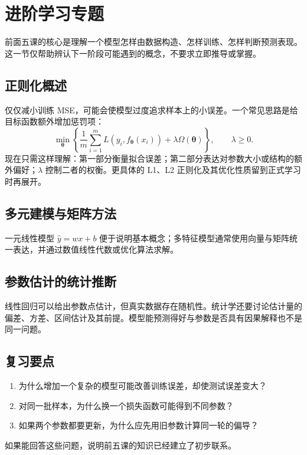 \section{进阶学习专题}\label{ch:open-questions}

前面五课的核心是理解一个模型怎样由数据构造、怎样训练、怎样判断预测表现。这一节仅帮助辨认下一阶段可能遇到的概念，不要求立即推导或掌握。

\subsection{正则化概述}

仅仅减小训练 MSE，可能会使模型过度追求样本上的小误差。一个常见思路是给目标函数额外增加惩罚项：
\[
\min_{\boldsymbol\theta}
\left\{\frac1m\sum_{i=1}^{m}L(y_i,f_{\boldsymbol\theta}(x_i))
+\lambda\Omega(\boldsymbol\theta)\right\},\qquad \lambda\ge0.
\]
现在只需这样理解：第一部分衡量拟合误差；第二部分表达对参数大小或结构的额外偏好；$\lambda$ 控制二者的权衡。更具体的 L1、L2 正则化及其优化性质留到正式学习时再展开。

\subsection{多元建模与矩阵方法}

一元线性模型 $\hat y=wx+b$ 便于说明基本概念；多特征模型通常使用向量与矩阵统一表达，并通过数值线性代数或优化算法求解。

\subsection{参数估计的统计推断}

线性回归可以给出参数点估计，但真实数据存在随机性。统计学还要讨论估计量的偏差、方差、区间估计及其前提。模型能预测得好与参数是否具有因果解释也不是同一问题。

\subsection{复习要点}

\begin{enumerate}
\item 为什么增加一个复杂的模型可能改善训练误差，却使测试误差变大？
\item 对同一批样本，为什么换一个损失函数可能得到不同参数？
\item 如果两个参数都要更新，为什么应先用旧参数计算同一轮的偏导？
\end{enumerate}
如果能回答这些问题，说明前五课的知识已经建立了初步联系。
